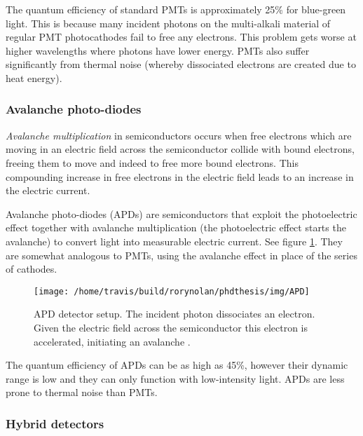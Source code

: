 \documentclass[12pt,]{book}
\theoremstyle{definition}
\theoremstyle{definition}
\theoremstyle{definition}
\theoremstyle{remark}
\let\BeginKnitrBlock\begin \let\EndKnitrBlock\end
\begin{document}
The quantum efficiency of standard PMTs is approximately 25\% for
blue-green light. This is because many incident photons on the
multi-alkali material of regular PMT photocathodes fail to free any
electrons. This problem gets worse at higher wavelengths where photons
have lower energy. PMTs also suffer significantly from thermal noise
(whereby dissociated electrons are created due to heat energy).

\subsubsection{Avalanche photo-diodes}\label{avalanche-photo-diodes}

\BeginKnitrBlock{definition}
\protect\hypertarget{def:unnamed-chunk-7}{}{\label{def:unnamed-chunk-7}
}\emph{Avalanche multiplication} in semiconductors occurs when free
electrons which are moving in an electric field across the semiconductor
collide with bound electrons, freeing them to move and indeed to free
more bound electrons. This compounding increase in free electrons in the
electric field leads to an increase in the electric current.
\EndKnitrBlock{definition}

Avalanche photo-diodes (APDs) are semiconductors that exploit the
photoelectric effect together with avalanche multiplication (the
photoelectric effect starts the avalanche) to convert light into
measurable electric current. See figure \ref{fig:APD}. They are somewhat
analogous to PMTs, using the avalanche effect in place of the series of
cathodes.





\begin{figure}

\texttt{[image: /home/travis/build/rorynolan/phdthesis/img/APD]} \hfill{}

\caption{APD detector setup. The incident photon dissociates an
electron. Given the electric field across the semiconductor this
electron is accelerated, initiating an avalanche \citep{LeicaDetectors}.}\label{fig:APD}
\end{figure}

The quantum efficiency of APDs can be as high as 45\%, however their
dynamic range is low and they can only function with low-intensity
light. APDs are less prone to thermal noise than PMTs.

\subsubsection{Hybrid detectors}\label{HyDs}
\end{document}

